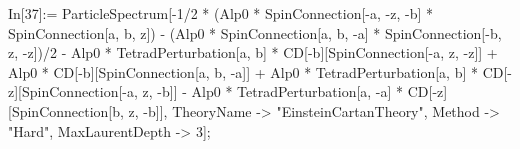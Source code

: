In[37]:= ParticleSpectrum[-1/2 * (Alp0 * SpinConnection[-a, -z, -b] * SpinConnection[a, b, z]) - (Alp0 * SpinConnection[a, b, -a] * SpinConnection[-b, z, -z])/2 - Alp0 * TetradPerturbation[a, b] * CD[-b][SpinConnection[-a, z, -z]] + Alp0 * CD[-b][SpinConnection[a, b, -a]] + Alp0 * TetradPerturbation[a, b] * CD[-z][SpinConnection[-a, z, -b]] - Alp0 * TetradPerturbation[a, -a] * CD[-z][SpinConnection[b, z, -b]], TheoryName -> "EinsteinCartanTheory", Method -> "Hard", MaxLaurentDepth -> 3]; 